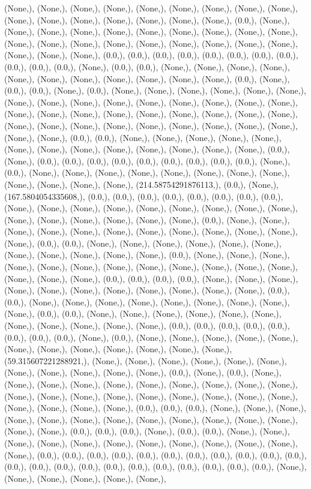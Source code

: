 \documentclass{article}
\begin{document}
(None,), (None,), (None,), (None,), (None,), (None,), (None,), (None,), (None,), (None,), (None,), (None,), (None,), (None,), (None,), (None,), (0.0,), (None,), (None,), (None,), (None,), (None,), (None,), (None,), (None,), (None,), (None,), (None,), (None,), (None,), (None,), (None,), (None,), (None,), (None,), (None,), (None,), (None,), (None,), (0.0,), (0.0,), (0.0,), (0.0,), (0.0,), (0.0,), (0.0,), (0.0,), (0.0,), (0.0,), (0.0,), (None,), (0.0,), (0.0,), (None,), (None,), (None,), (None,), (None,), (None,), (None,), (None,), (None,), (None,), (None,), (0.0,), (None,), (0.0,), (0.0,), (None,), (0.0,), (None,), (None,), (None,), (None,), (None,), (None,), (None,), (None,), (None,), (None,), (None,), (None,), (None,), (None,), (None,), (None,), (None,), (None,), (None,), (None,), (None,), (None,), (None,), (None,), (None,), (None,), (None,), (None,), (None,), (None,), (None,), (None,), (None,), (None,), (None,), (0.0,), (0.0,), (None,), (None,), (None,), (None,), (None,), (None,), (None,), (None,), (None,), (None,), (None,), (None,), (None,), (0.0,), (None,), (0.0,), (0.0,), (0.0,), (0.0,), (0.0,), (0.0,), (0.0,), (0.0,), (0.0,), (None,), (0.0,), (None,), (None,), (None,), (None,), (None,), (None,), (None,), (None,), (None,), (None,), (None,), (None,), (214.58754291876113,), (0.0,), (None,), (167.5804054335608,), (0.0,), (0.0,), (0.0,), (0.0,), (0.0,), (0.0,), (0.0,), (0.0,), (None,), (None,), (None,), (None,), (None,), (None,), (None,), (None,), (None,), (None,), (None,), (None,), (None,), (None,), (None,), (0.0,), (None,), (None,), (None,), (None,), (None,), (None,), (None,), (None,), (None,), (None,), (None,), (None,), (0.0,), (0.0,), (None,), (None,), (None,), (None,), (None,), (None,), (None,), (None,), (None,), (None,), (None,), (0.0,), (None,), (None,), (None,), (None,), (None,), (None,), (None,), (None,), (None,), (None,), (None,), (None,), (None,), (None,), (None,), (0.0,), (0.0,), (0.0,), (0.0,), (None,), (None,), (None,), (None,), (None,), (None,), (None,), (None,), (None,), (None,), (None,), (0.0,), (0.0,), (None,), (None,), (None,), (None,), (None,), (None,), (None,), (None,), (None,), (0.0,), (0.0,), (None,), (None,), (None,), (None,), (None,), (None,), (None,), (None,), (None,), (None,), (None,), (0.0,), (0.0,), (0.0,), (0.0,), (0.0,), (0.0,), (0.0,), (0.0,), (None,), (0.0,), (None,), (None,), (None,), (None,), (None,), (None,), (None,), (None,), (None,), (None,), (None,), (None,), (59.315607221288921,), (None,), (None,), (None,), (None,), (None,), (None,), (None,), (None,), (None,), (None,), (None,), (0.0,), (None,), (0.0,), (None,), (None,), (None,), (None,), (None,), (None,), (None,), (None,), (None,), (None,), (None,), (None,), (None,), (None,), (None,), (None,), (None,), (None,), (None,), (None,), (None,), (None,), (None,), (0.0,), (0.0,), (0.0,), (None,), (None,), (None,), (None,), (None,), (None,), (None,), (None,), (None,), (None,), (None,), (None,), (None,), (None,), (0.0,), (0.0,), (0.0,), (None,), (0.0,), (0.0,), (None,), (None,), (None,), (None,), (None,), (None,), (None,), (None,), (None,), (None,), (None,), (None,), (0.0,), (0.0,), (0.0,), (0.0,), (0.0,), (0.0,), (0.0,), (0.0,), (0.0,), (0.0,), (0.0,), (0.0,), (0.0,), (0.0,), (0.0,), (0.0,), (0.0,), (0.0,), (0.0,), (0.0,), (0.0,), (0.0,), (None,), (None,), (None,), (None,), (None,), (None,), 
\end{document}
